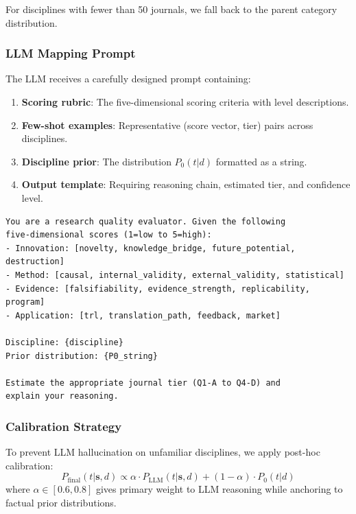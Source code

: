 \documentclass[11pt,a4paper]{article}
\begin{document}
For disciplines with fewer than 50 journals, we fall back to the parent category distribution.

\subsubsection{LLM Mapping Prompt}

The LLM receives a carefully designed prompt containing:

\begin{enumerate}
    \item \textbf{Scoring rubric}: The five-dimensional scoring criteria with level descriptions.
    \item \textbf{Few-shot examples}: Representative (score vector, tier) pairs across disciplines.
    \item \textbf{Discipline prior}: The distribution $P_0(t|d)$ formatted as a string.
    \item \textbf{Output template}: Requiring reasoning chain, estimated tier, and confidence level.
\end{enumerate}

\begin{verbatim}
You are a research quality evaluator. Given the following 
five-dimensional scores (1=low to 5=high):
- Innovation: [novelty, knowledge_bridge, future_potential, destruction]
- Method: [causal, internal_validity, external_validity, statistical]
- Evidence: [falsifiability, evidence_strength, replicability, program]
- Application: [trl, translation_path, feedback, market]

Discipline: {discipline}
Prior distribution: {P0_string}

Estimate the appropriate journal tier (Q1-A to Q4-D) and 
explain your reasoning.
\end{verbatim}

\subsubsection{Calibration Strategy}

To prevent LLM hallucination on unfamiliar disciplines, we apply post-hoc calibration:
\begin{equation}
P_{\text{final}}(t|\mathbf{s}, d) \propto \alpha \cdot P_{\text{LLM}}(t|\mathbf{s}, d) + (1-\alpha) \cdot P_0(t|d)
\end{equation}
where $\alpha \in [0.6, 0.8]$ gives primary weight to LLM reasoning while anchoring to factual prior distributions.
\end{document}
